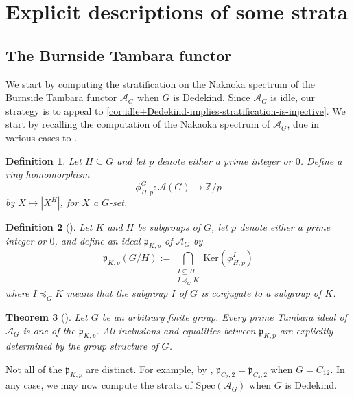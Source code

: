 \documentclass[11pt,dvipsnames]{amsart}
\newcommand{\Z}{\mathbb{Z}}
\newcommand{\A}{\mathcal{A}}
\newcommand{\p}{\mathfrak{p}}
\newtheorem{theorem}{Theorem}[section]
\theoremstyle{BoldRemark}
\newtheorem{definition}[theorem]{Definition}
\newcommand{\Spec}{\mathrm{Spec}}
\renewcommand{\subset}{\subseteq}
\begin{document}
\section{Explicit descriptions of some strata}\label{sec:examples}

\subsection{The Burnside Tambara functor}\label{subsec:Burnside_example}

We start by computing the stratification on the Nakaoka spectrum of the Burnside Tambara functor $\A_G$ when $G$ is Dedekind. Since $\A_G$ is idle, our strategy is to appeal to \cref{cor:idle+Dedekind-implies-stratification-is-injective}. We start by recalling the computation of the Nakaoka spectrum of $\A_G$, due in various cases to \cite{Nak14,CG23,4DSC}.

\begin{definition}
    Let $H \subset G$ and let $p$ denote either a prime integer or $0$. Define a ring homomorphism
    \[ 
        \phi^G_{H,p} : \A(G) \rightarrow \Z/p 
    \] 
    by $X \mapsto |X^H|$, for $X$ a $G$-set.
\end{definition}

\begin{definition}[{\cite[Definition 3.1]{CG23}}]
    Let $K$ and $H$ be subgroups of $G$, let $p$ denote either a prime integer or $0$, and define an ideal $\p_{K,p}$ of $\A_G$ by
    \[ 
        \p_{K,p}(G/H) := \bigcap_{\substack{I \subset H \\ I \preccurlyeq_G K}} \mathrm{Ker}(\phi_{H,p}^I)
    \] 
    where $I \preccurlyeq_G K$ means that the subgroup $I$ of $G$ is conjugate to a subgroup of $K$.
\end{definition}

\begin{theorem}[\cite{Nak14,CG23,4DSC}]
    Let $G$ be an arbitrary finite group. Every prime Tambara ideal of $\A_G$ is one of the $\p_{K,p}$. All inclusions and equalities between $\p_{K,p}$ are explicitly determined by the group structure of $G$.
\end{theorem}

Not all of the $\p_{K,p}$ are distinct. For example, by \cite[Figure 1]{CG23}, $\p_{C_2,2} = \p_{C_4,2}$ when $G = C_{12}$. In any case, we may now compute the strata of $\Spec(\A_G)$ when $G$ is Dedekind.
\end{document}
